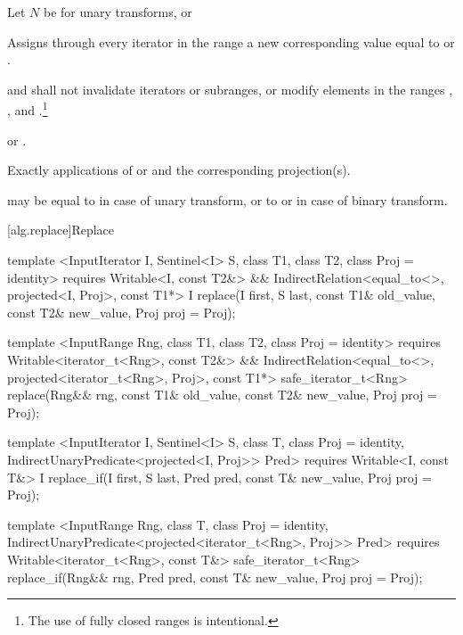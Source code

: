 \begin{itemdescr}
\pnum
Let $N$ be 
for unary transforms, or 

\pnum
\effects
Assigns through every iterator
in the range
a new
corresponding value equal to
or
.

\pnum
\requires
{} and 
shall not invalidate iterators or subranges, or modify elements in the ranges
,
,
and
.\footnote{The use of fully
closed ranges is intentional.}

\pnum
\returns
{}
 or .

\pnum
\complexity
Exactly
applications of
 or  and the corresponding projection(s).

\pnum
\notes
{} may be equal to 
in case of unary transform,
or to  or 
in case of binary transform.
\end{itemdescr}

[alg.replace]{Replace}

%
%
\begin{itemdecl}
template <InputIterator I, Sentinel<I> S, class T1, class T2, class Proj = identity>
  requires Writable<I, const T2&> &&
    IndirectRelation<equal_to<>, projected<I, Proj>, const T1*>
  I
    replace(I first, S last, const T1& old_value, const T2& new_value, Proj proj = Proj{});

template <InputRange Rng, class T1, class T2, class Proj = identity>
  requires Writable<iterator_t<Rng>, const T2&> &&
    IndirectRelation<equal_to<>, projected<iterator_t<Rng>, Proj>, const T1*>
  safe_iterator_t<Rng>
    replace(Rng&& rng, const T1& old_value, const T2& new_value, Proj proj = Proj{});

template <InputIterator I, Sentinel<I> S, class T, class Proj = identity,
    IndirectUnaryPredicate<projected<I, Proj>> Pred>
  requires Writable<I, const T&>
  I
    replace_if(I first, S last, Pred pred, const T& new_value, Proj proj = Proj{});

template <InputRange Rng, class T, class Proj = identity,
    IndirectUnaryPredicate<projected<iterator_t<Rng>, Proj>> Pred>
  requires Writable<iterator_t<Rng>, const T&>
  safe_iterator_t<Rng>
    replace_if(Rng&& rng, Pred pred, const T& new_value, Proj proj = Proj{});
\end{itemdecl}

